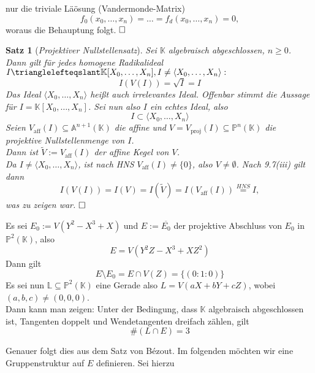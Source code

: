 \documentclass[11pt]{book}
\newtheorem{theorem}{Satz}[section]
\theoremstyle{nonumberbreak}
\newenvironment{pr}[1][]{\ifthenelse{\equal{#1}{}}{\proof}{\proof[#1]}\rm}{\endproof}
\newenvironment{ex}[1][]{\ifthenelse{\equal{#1}{}}{\example}{\example[#1]}\rm}{\endexample}
\newenvironment{definbem}[1][]{\ifthenelse{\equal{#1}{}}{\definibem}{\definibem[#1]}\rm}{\enddefinibem}
\begin{document}
\begin{spacing}{1.3}
\begin{definbem}
\begin{pr}
\begin{compactenum}
nur die triviale Läösung (Vandermonde-Matrix)
$$f_0(x_0, \ldots, x_n) = \ldots = f_d(x_0, \ldots, x_n) = 0,$$
woraus die Behauptung folgt. $\hfill \Box$
\end{compactenum} 
\end{pr}
\end{definbem}

\begin{theorem}[\rm \it Projektiver Nullstellensatz]

Sei $\mathbb{K}$ algebraisch abgeschlossen, $n \geqslant 0$. Dann gilt für jedes homogene Radikalideal $I \trianglelefteqslant \mathbb{K}[X_0, \ldots, X_n], I \neq \langle X_0, \ldots, X_n \rangle:$\\
$$I(V(I))=\sqrt{I}=I$$
Das Ideal $\langle X_0, \ldots, X_n\rangle$ heißt auch \textit{irrelevantes Ideal}.
\begin{pr}
Offenbar stimmt die Aussage für $I= \mathbb{K}[X_0, \ldots, X_n]$. Sei nun also $I$ ein echtes Ideal, also 
$$I \subset \langle X_0, \ldots, X_n \rangle$$
Seien $V_{\textrm{aff}}(I) \subseteq \mathbb{A}^{n+1}(\mathbb{K})$ die affine und $V=V_{\textrm{proj}}(I) \subseteq \mathbb{P}^n(\mathbb{K})$ die projektive Nullstellenmenge von $I$.\\
Dann ist $\tilde{V}:=V_{\textrm{aff}}(I)$ der affine Kegel von $V$.\\
Da $I \neq \langle X_0, \ldots, X_n \rangle$, ist nach HNS $V_{\textrm{aff}}(I) \neq \{0 \}$, also $V \neq \emptyset$. Nach 9.7(iii) gilt dann
$$I(V(I)) = I(V)=I (\tilde{V})= I ( V_{\textrm{aff}}(I)) \overset{HNS}{=} I,$$
was zu zeigen war. $\hfill \Box$
\end{pr}
\end{theorem}

\begin{ex} %

Es sei $E_0:=V(Y^2-X^3+X)$ und $E:=\overline{E_0}$ der projektive Abschluss von $E_0$ in $\mathbb{P}^2(\mathbb{K})$, also
$$E=V(Y^2Z-X^3+XZ^2)$$
Dann gilt 
$$E \setminus E_0 = E \cap V(Z) = \{(0:1:0) \}$$
Es sei nun $\mathbb{L}\subseteq \mathbb{P}^2(\mathbb{K})$ eine Gerade also $L=V(aX+bY+cZ)$, wobei $(a,b,c) \neq (0,0,0)$.\\
Dann kann man zeigen: Unter der Bedingung, dass $\mathbb{K}$ algebraisch abgeschlossen ist, Tangenten doppelt  und Wendetangenten dreifach zählen, gilt
$$\# (L \cap E) = 3$$

Genauer folgt dies aus dem Satz von Bézout. Im folgenden möchten wir eine Gruppenstruktur auf $E$ definieren. Sei hierzu


\end{ex}
\end{spacing}
\end{document}
